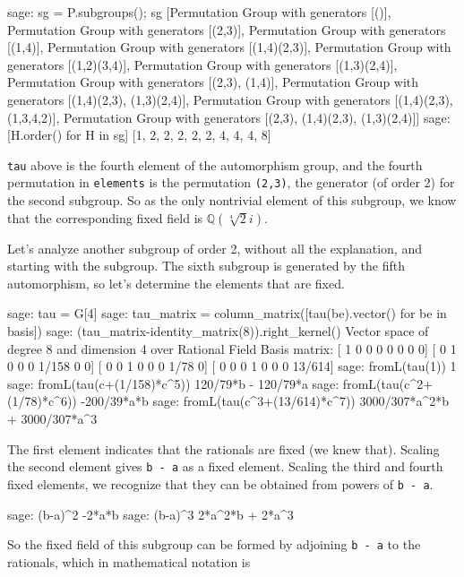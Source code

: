 %
\begin{sageexample}
sage: sg = P.subgroups(); sg
[Permutation Group with generators [()],
 Permutation Group with generators [(2,3)],
 Permutation Group with generators [(1,4)],
 Permutation Group with generators [(1,4)(2,3)],
 Permutation Group with generators [(1,2)(3,4)],
 Permutation Group with generators [(1,3)(2,4)],
 Permutation Group with generators [(2,3), (1,4)],
 Permutation Group with generators [(1,4)(2,3), (1,3)(2,4)],
 Permutation Group with generators [(1,4)(2,3), (1,3,4,2)],
 Permutation Group with generators [(2,3), (1,4)(2,3), (1,3)(2,4)]]
sage: [H.order() for H in sg]
[1, 2, 2, 2, 2, 2, 4, 4, 4, 8]
\end{sageexample}
%
\verb?tau? above is the fourth element of the automorphism group, and the fourth permutation in \verb?elements? is the permutation \verb?(2,3)?, the generator (of order 2) for the second subgroup.  So as the only nontrivial element of this subgroup, we know that the corresponding fixed field is ${\mathbb Q}(\sqrt[4]{2}i)$.\par
%
Let's analyze another subgroup of order 2, without all the explanation, and starting with the subgroup.  The sixth subgroup is generated by the fifth automorphism, so let's determine the elements that are fixed.
%
\begin{sageexample}
sage: tau = G[4]
sage: tau_matrix = column_matrix([tau(be).vector() for be in basis])
sage: (tau_matrix-identity_matrix(8)).right_kernel()
Vector space of degree 8 and dimension 4 over Rational Field
Basis matrix:
[     1      0      0      0      0      0      0      0]
[     0      1      0      0      0  1/158      0      0]
[     0      0      1      0      0      0   1/78      0]
[     0      0      0      1      0      0      0 13/614]
sage: fromL(tau(1))
1
sage: fromL(tau(c+(1/158)*c^5))
120/79*b - 120/79*a
sage: fromL(tau(c^2+(1/78)*c^6))
-200/39*a*b
sage: fromL(tau(c^3+(13/614)*c^7))
3000/307*a^2*b + 3000/307*a^3
\end{sageexample}
%
The first element indicates that the rationals are fixed (we knew that).  Scaling the second element gives \verb?b - a? as a fixed element.  Scaling the third and fourth fixed elements, we recognize that they can be obtained from powers of \verb?b - a?.
%
\begin{sageexample}
sage: (b-a)^2
-2*a*b
sage: (b-a)^3
2*a^2*b + 2*a^3
\end{sageexample}
%
So the fixed field of this subgroup can be formed by adjoining \verb?b - a? to the rationals, which in mathematical notation is
